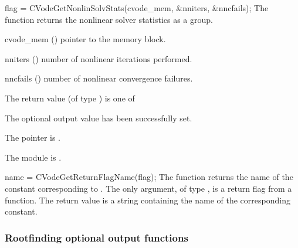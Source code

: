{
  flag = CVodeGetNonlinSolvStats(cvode\_mem, \&nniters, \&nncfails);
}
{
  The function  returns the
  {\cvode} nonlinear solver statistics as a group.
}
{
  \begin{args}
  \item[cvode\_mem] ()
    pointer to the {\cvode} memory block.
  \item[nniters] ()
    number of nonlinear iterations performed.
  \item[nncfails] ()
    number of nonlinear convergence failures.
  \end{args}
}
{
  The return value  (of type ) is one of
  \begin{args}
  \item[\Id{CV\_SUCCESS}]
    The optional output value has been successfully set.
  \item[\Id{CV\_MEM\_NULL}]
    The  pointer is .
  \item[\Id{CV\_MEM\_FAIL}]
    The {\sunnonlinsol} module is .
  \end{args}
}
{}
{
  name = CVodeGetReturnFlagName(flag);
}
{
  The function  returns the
  name of the {\cvode} constant corresponding to .
}
{
  The only argument, of type , is a return flag from a {\cvode} function.
}
{
  The return value is a string containing the name of the corresponding constant.
}
{}


\subsubsection{Rootfinding optional output functions}\label{sss:optout_root}


